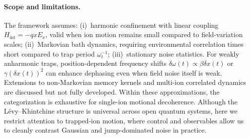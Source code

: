 \paragraph{Scope and limitations.}
The framework assumes: (i)~harmonic confinement with linear coupling $H_{\text{int}} = -qxE_x$, valid when ion motion remains small compared to field-variation scales; (ii)~Markovian bath dynamics, requiring environmental correlation times short compared to trap period $\omega_t^{-1}$; (iii)~stationary noise statistics. For weakly anharmonic traps, position-dependent frequency shifts $\delta\omega(t) \propto \beta \delta x(t)$ or $\gamma (\delta x(t))^2$ can enhance dephasing even when field noise itself is weak. Extensions to non-Markovian memory kernels and multi-ion correlated dynamics are discussed but not fully developed. Within these approximations, the categorization is exhaustive for single-ion motional decoherence.
Although the L\'evy--Khintchine structure is universal across open quantum systems, here we restrict attention to trapped-ion motion, where control and observables allow us to cleanly contrast Gaussian and jump-dominated noise in practice.